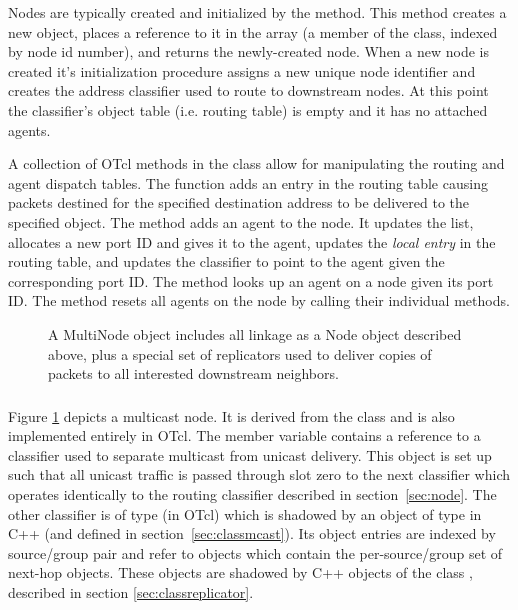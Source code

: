 Nodes are typically created and initialized by the
 method.
This method creates a new  object, places a reference to
it in the array  (a member of the  class,
indexed by node id number), and returns the newly-created node.
When a new node is created it's initialization procedure
 assigns a new unique node identifier and
creates the address classifier used to route to downstream nodes.
At this point the classifier's object table (i.e. routing table) is empty
and it has no attached agents.

A collection of OTcl methods in the  class allow
for manipulating the routing and agent dispatch tables.
The  function adds an entry in the 
routing table causing packets destined for the specified destination address
to be delivered to the specified object.
The  method adds an agent to the node.
It updates the  list, allocates a new port ID and gives it
to the agent, updates the {\em local entry} in the routing table, and
updates the  classifier to point to the agent given the
corresponding port ID.
The  method looks up an agent on a node given its port ID.
The  method resets all agents on the node by calling
their individual  methods.

\begin{figure}[h]
\centerline{}
\caption{\label{pic:mnode}A MultiNode object includes all
linkage as a Node object described above, plus a
special set of replicators used to deliver copies of
packets to all interested downstream neighbors.}
\end{figure}

\subsubsection{}

Figure \ref{pic:mnode} depicts a multicast node.
It is derived from the  class and is also implemented
entirely in OTcl.
The  member variable
contains a reference to a classifier used to separate
multicast from unicast delivery.
This object is set up such that all unicast traffic is
passed through slot zero to the next classifier which operates
identically to the routing classifier described in section~\ref{sec:node}.
The other classifier is of type 
(in OTcl) which is shadowed by an object of type
 in C++
(and defined in section~\ref{sec:classmcast}).
Its object entries are indexed by source/group pair and refer to
 objects which contain
the per-source/group set of next-hop objects.
These objects are shadowed by C++ objects of the
class , described in section
\ref{sec:classreplicator}.

